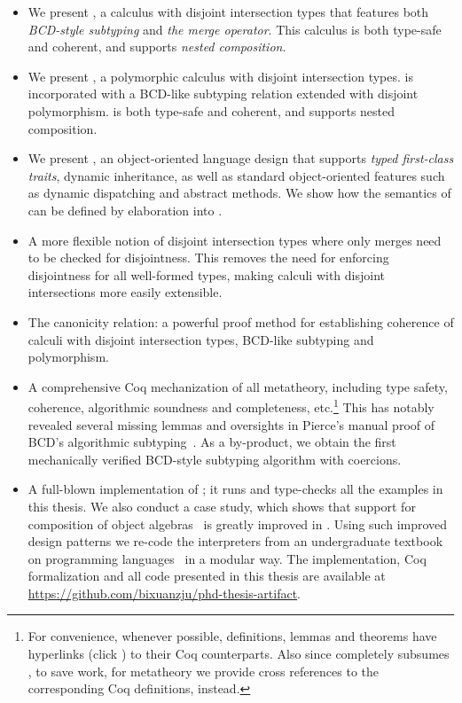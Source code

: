 \begin{itemize}

\item We present \namee, a calculus with disjoint intersection types that
  features both \emph{BCD-style subtyping} and \emph{the merge operator}. This
  calculus is both type-safe and coherent, and supports \emph{nested composition}.

\item We present \fnamee, a polymorphic calculus with disjoint intersection
  types. \fnamee is incorporated with a BCD-like subtyping relation extended
  with disjoint polymorphism. \fnamee is both type-safe and coherent, and
  supports nested composition.

\item We present \sedel, an object-oriented language design that supports
  \emph{typed first-class traits}, dynamic inheritance, as well as standard
  object-oriented features such as dynamic dispatching and abstract methods. We
  show how the semantics of \sedel can be defined by elaboration into \fnamee.

\item A more flexible notion of disjoint intersection types where only merges
  need to be checked for disjointness. This removes the need for enforcing
  disjointness for all well-formed types, making calculi with disjoint
  intersections more easily extensible.

\item The canonicity relation: a powerful proof method for establishing
  coherence of calculi with disjoint intersection types, BCD-like subtyping and
  polymorphism.

\item A comprehensive Coq mechanization of all metatheory, including type
  safety, coherence, algorithmic soundness and completeness, etc.\footnote{For
    convenience, whenever possible, definitions, lemmas and theorems have hyperlinks (click
    \href{https://github.com/bixuanzju/phd-thesis-artifact}{\leftpointright}) to their Coq counterparts. Also since \fnamee completely
    subsumes \namee, to save work, for \namee metatheory we provide cross
    references to the corresponding \fnamee Coq definitions, instead.} This has
  notably revealed several missing lemmas and oversights in Pierce's manual
  proof of BCD's algorithmic subtyping~\citep{pierce1989decision}. As a
  by-product, we obtain the first mechanically verified BCD-style subtyping
  algorithm with coercions.

\item A full-blown implementation of \sedel; it runs and type-checks all the
  examples in this thesis. We also conduct a case study, which shows that
  support for composition of object algebras~\citep{oliveira2012extensibility}
  is greatly improved in \sedel. Using such improved design patterns we re-code
  the interpreters from an undergraduate textbook on programming
  languages~\citep{poplcook} in a modular way. The implementation, Coq
  formalization and all code presented in this thesis are available at
  \url{https://github.com/bixuanzju/phd-thesis-artifact}.

\end{itemize}


